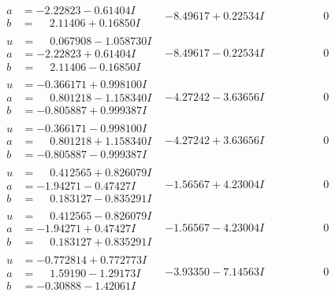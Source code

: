 \documentclass[1p]{elsarticle_modified}
\theoremstyle{definition}
\begin{document}
$$\begin{array}{c|c|c}
\begin{aligned}
a &= -2.22823 - 0.61404 I \\
b &= \phantom{-}2.11406 + 0.16850 I\end{aligned}
 & -8.49617 + 0.22534 I & \phantom{-0.000000 } 0 \\ \hline\begin{aligned}
u &= \phantom{-}0.067908 - 1.058730 I \\
a &= -2.22823 + 0.61404 I \\
b &= \phantom{-}2.11406 - 0.16850 I\end{aligned}
 & -8.49617 - 0.22534 I & \phantom{-0.000000 } 0 \\ \hline\begin{aligned}
u &= -0.366171 + 0.998100 I \\
a &= \phantom{-}0.801218 - 1.158340 I \\
b &= -0.805887 + 0.999387 I\end{aligned}
 & -4.27242 - 3.63656 I & \phantom{-0.000000 } 0 \\ \hline\begin{aligned}
u &= -0.366171 - 0.998100 I \\
a &= \phantom{-}0.801218 + 1.158340 I \\
b &= -0.805887 - 0.999387 I\end{aligned}
 & -4.27242 + 3.63656 I & \phantom{-0.000000 } 0 \\ \hline\begin{aligned}
u &= \phantom{-}0.412565 + 0.826079 I \\
a &= -1.94271 - 0.47427 I \\
b &= \phantom{-}0.183127 - 0.835291 I\end{aligned}
 & -1.56567 + 4.23004 I & \phantom{-0.000000 } 0 \\ \hline\begin{aligned}
u &= \phantom{-}0.412565 - 0.826079 I \\
a &= -1.94271 + 0.47427 I \\
b &= \phantom{-}0.183127 + 0.835291 I\end{aligned}
 & -1.56567 - 4.23004 I & \phantom{-0.000000 } 0 \\ \hline\begin{aligned}
u &= -0.772814 + 0.772773 I \\
a &= \phantom{-}1.59190 - 1.29173 I \\
b &= -0.30888 - 1.42061 I\end{aligned}
 & -3.93350 - 7.14563 I & \phantom{-0.000000 } 0 \\ \hline\begin{aligned}

\end{aligned}
\end{array}$$
\end{document}
